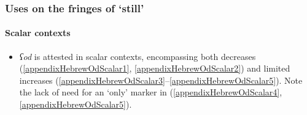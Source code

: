 \subsubsection{Uses on the fringes of \lq{}still\rq{}}
\paragraph{Scalar contexts}\label{appendixHebrewOdScalar}
\begin{itemize}
	\item \textit{ʕod} is attested in scalar contexts, encompassing both decreases  (\ref{appendixHebrewOdScalar1}, \ref{appendixHebrewOdScalar2}) and limited increases (\ref{appendixHebrewOdScalar3}–\ref{appendixHebrewOdScalar5}). Note the lack of need for an \lq only\rq{ }marker in (\ref{appendixHebrewOdScalar4}, \ref{appendixHebrewOdScalar5}). 
\end{itemize}

